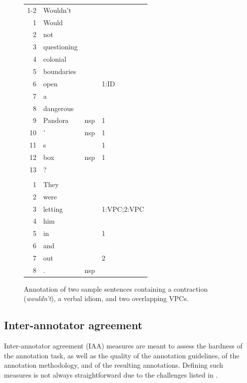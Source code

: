 \documentclass[output=paper,modfonts]{langscibook}
\begin{document}
\begin{figure}[ht]
\centering
\begin{small}
\setlength{\tabcolsep}{5.5mm}
\begin{tabular}{rlll}
1-2 & Wouldn't & & \\
1   & Would & & \\
2   & not & & \\
3   & questioning & & \\     
4   & colonial & & \\
5   & boundaries & & \\ 
6   & open & & 1:ID \\
7   & a & & \\
8   & dangerous & &  \\
9   & Pandora  & nsp & 1 \\
10  & '        & nsp & 1 \\
11  & s        &     & 1 \\
12  & box      & nsp & 1  \\
13  & ? & &  \\
&&& \\
1 & They & & \\
2 & were & & \\
3   & letting & & 1:VPC;2:VPC \\
4   & him & & \\
5   & in  & & 1 \\
6   & and & &  \\
7   & out & & 2 \\
8   & .  & nsp &  \\
\end{tabular}
\end{small}
\caption{Annotation of two sample sentences containing a contraction (\textit{wouldn't}), a verbal idiom, and two overlapping VPCs.}
\label{fig:format}
\end{figure}

\subsection{Inter-annotator agreement}
\label{sec:iaa}
%

Inter-annotator agreement (IAA) measures are meant to assess the hardness of the annotation task, as well as the quality of the annotation guidelines, of the annotation methodology, and of the resulting annotations. Defining such measures is not always straightforward due to the challenges listed in .
\end{document}
